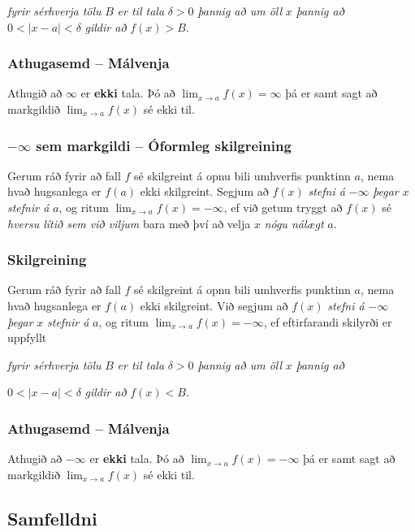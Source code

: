 \documentclass[icelandic,a4paper,12pt]{article}
\begin{document}
\emph{fyrir sérhverja tölu} $B$ \emph{er til tala} $\delta>0$ \emph{þannig
  að um öll} $x$ \emph{þannig að}
$0<|x-a|<\delta$ 
\emph{gildir að} $f(x)>B$.


\subsubsection{Athugasemd -- Málvenja}  Athugið að $\infty$ er {\bf ekki} tala.  Þó 
að  $\lim_{x\rightarrow a} f(x)=\infty$ þá er samt sagt að
markgildið $\lim_{x\rightarrow a} f(x)$ sé ekki til.

\subsubsection{$-\infty$ sem markgildi -- Óformleg skilgreining}  Gerum ráð fyrir að fall $f$ sé
skilgreint á opnu bili umhverfis punktinn $a$, nema hvað hugsanlega er
$f(a)$ ekki skilgreint.  Segjum að  $f(x)$
\emph{stefni á} $-\infty$ \emph{þegar} $x$ \emph{stefnir á} $a$, og ritum
$\lim_{x\rightarrow a} f(x)=-\infty$, ef við getum tryggt að  $f(x)$ sé 
  \emph{hversu lítið sem við viljum}
 bara með því að velja $x$ \emph{nógu nálægt} $a$.  
 
\pause
\subsubsection{Skilgreining}
 Gerum ráð fyrir að fall $f$ sé
skilgreint á opnu bili umhverfis punktinn $a$, nema hvað hugsanlega er
$f(a)$ ekki skilgreint.  Við segjum að $f(x)$
\emph{stefni á} $-\infty$ \emph{þegar} $x$ \emph{stefnir á} $a$, og ritum
$\lim_{x\rightarrow a} f(x)=-\infty$, ef eftirfarandi skilyrði er uppfyllt

\emph{fyrir sérhverja tölu} $B$ \emph{er til tala} $\delta>0$ \emph{þannig
  að um öll} $x$ \emph{þannig að}

$0<|x-a|<\delta$ 
\emph{gildir að} $f(x)<B$.

\subsubsection{Athugasemd -- Málvenja}  Athugið að $-\infty$ er {\bf ekki} tala.  Þó 
að  $\lim_{x\rightarrow a} f(x)=-\infty$ þá er samt sagt að
markgildið $\lim_{x\rightarrow a} f(x)$ sé ekki til.
 

\subsection{Samfelldni}
\end{document}

